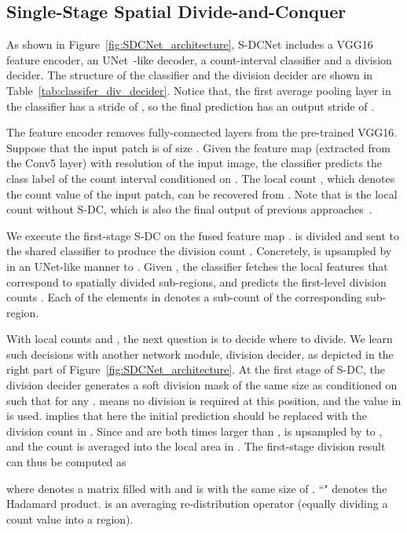 \documentclass[10pt,twocolumn,letterpaper]{article}
\begin{document}
	
	\subsection{Single-Stage Spatial Divide-and-Conquer}  \label{sec:S-DCNet_Arc}   
	As shown in Figure~\ref{fig:SDCNet_architecture}, S-DCNet includes a VGG16~\cite{Simonyan2014Very_VGG16} feature encoder, an UNet~\cite{Unet2015U}-like decoder, a count-interval classifier and a division decider. The structure of the classifier and the division decider are shown in Table~\ref{tab:classifer_div_decider}. Notice that, the first average pooling layer in the classifier has a stride of , so the final prediction has an output stride of .
	
	The feature encoder removes fully-connected layers from the pre-trained VGG16. Suppose that the input patch is of size . Given the feature map  (extracted from the Conv5 layer) with  resolution of the input image, the classifier predicts the class label of the count interval  conditioned on . The local count , which denotes the count value of the  input patch, can be recovered from . Note that  is the local count without S-DC, which is also the final output of previous approaches~\cite{Count_everyday_2017_CVPR,Count_ception_2017_ICCVW,Lu2017TasselNet}.  
	
	We execute the first-stage S-DC on the fused feature map .  is divided and sent to the shared classifier to produce the division count . Concretely,  is upsampled by  in an UNet-like manner to . Given , the classifier fetches the local features that correspond to spatially divided sub-regions, and predicts the first-level division counts . Each of the  elements in  denotes a sub-count of the corresponding  sub-region.
	
	With local counts  and , the next question is to decide where to divide. We learn such decisions with another network module, division decider, as depicted in the right part of Figure~\ref{fig:SDCNet_architecture}. At the first stage of S-DC, the division decider generates a soft division mask  of the same size as  conditioned on  such that for any .  means no division is required at this position, and the value in  is used.  implies that here the initial prediction should be replaced with the division count in . Since  and  are both  times larger than ,  is upsampled by  to , and the count is averaged into the  local area in . The first-stage division result  can thus be computed as 
	
	where  denotes a matrix filled with  and is with the same size of . ``" denotes the Hadamard product.  is an averaging re-distribution operator (equally dividing a count value into a  region).
	
\end{document}
